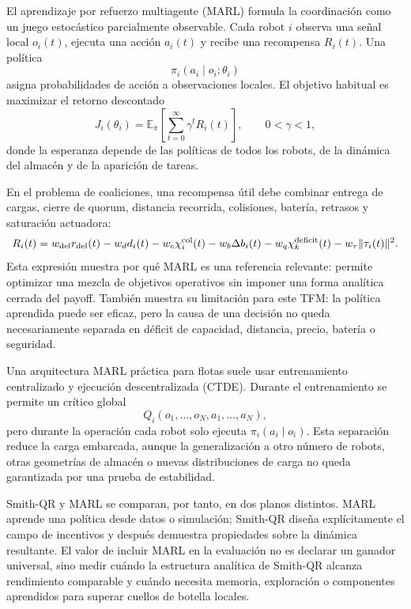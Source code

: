 El aprendizaje por refuerzo multiagente (MARL) formula la coordinación como un juego
estocástico parcialmente observable. Cada robot $i$ observa una señal local
$o_i(t)$, ejecuta una acción $a_i(t)$ y recibe una recompensa $R_i(t)$. Una política
\[
  \pi_i(a_i\mid o_i;\theta_i)
\]
asigna probabilidades de acción a observaciones locales. El objetivo habitual es
maximizar el retorno descontado
\begin{equation}
  J_i(\theta_i)=
  \mathbb{E}_{\pi}\left[
    \sum_{t=0}^{\infty}\gamma^t R_i(t)
  \right],
  \qquad 0<\gamma<1,
  \label{eq:marl_retorno}
\end{equation}
donde la esperanza depende de las políticas de todos los robots, de la dinámica del
almacén y de la aparición de tareas.

En el problema de coaliciones, una recompensa útil debe combinar entrega de cargas,
cierre de quorum, distancia recorrida, colisiones, batería, retrasos y saturación
actuadora:
\begin{equation}
  R_i(t)=
  w_{\rm del}r_{\rm del}(t)
  -w_d d_i(t)
  -w_c \chi_i^{\rm col}(t)
  -w_b \Delta b_i(t)
  -w_q \chi_k^{\rm deficit}(t)
  -w_\tau \|\tau_i(t)\|^2 .
  \label{eq:marl_reward}
\end{equation}
Esta expresión muestra por qué MARL es una referencia relevante: permite optimizar una
mezcla de objetivos operativos sin imponer una forma analítica cerrada del payoff.
También muestra su limitación para este TFM: la política aprendida puede ser eficaz, pero
la causa de una decisión no queda necesariamente separada en déficit de capacidad,
distancia, precio, batería o seguridad.

Una arquitectura MARL práctica para flotas suele usar entrenamiento centralizado y
ejecución descentralizada (CTDE). Durante el entrenamiento se permite un crítico global
\[
  Q_i(o_1,\ldots,o_N,a_1,\ldots,a_N),
\]
pero durante la operación cada robot solo ejecuta $\pi_i(a_i\mid o_i)$. Esta separación
reduce la carga embarcada, aunque la generalización a otro número de robots, otras
geometrías de almacén o nuevas distribuciones de carga no queda garantizada por una
prueba de estabilidad.

Smith-QR y MARL se comparan, por tanto, en dos planos distintos. MARL aprende una
política desde datos o simulación; Smith-QR diseña explícitamente el campo de incentivos
y después demuestra propiedades sobre la dinámica resultante. El valor de incluir MARL
en la evaluación no es declarar un ganador universal, sino medir cuándo la estructura
analítica de Smith-QR alcanza rendimiento comparable y cuándo necesita memoria,
exploración o componentes aprendidos para superar cuellos de botella locales.


